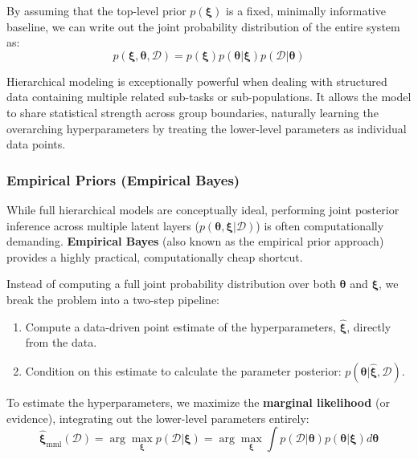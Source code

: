 \documentclass{article}
\begin{document}
By assuming that the top-level prior $p(\boldsymbol{\xi})$ is a fixed, minimally informative baseline, we can write out the joint probability distribution of the entire system as:
\begin{equation}
p(\boldsymbol{\xi}, \boldsymbol{\theta}, \mathcal{D}) = p(\boldsymbol{\xi})p(\boldsymbol{\theta}|\boldsymbol{\xi})p(\mathcal{D}|\boldsymbol{\theta})
\end{equation}

Hierarchical modeling is exceptionally powerful when dealing with structured data containing multiple related sub-tasks or sub-populations. It allows the model to share statistical strength across group boundaries, naturally learning the overarching hyperparameters by treating the lower-level parameters as individual data points.

\subsubsection{Empirical Priors (Empirical Bayes)}
While full hierarchical models are conceptually ideal, performing joint posterior inference across multiple latent layers ($p(\boldsymbol{\theta}, \boldsymbol{\xi} | \mathcal{D})$) is often computationally demanding. \textbf{Empirical Bayes} (also known as the empirical prior approach) provides a highly practical, computationally cheap shortcut. 

Instead of computing a full joint probability distribution over both $\boldsymbol{\theta}$ and $\boldsymbol{\xi}$, we break the problem into a two-step pipeline:
\begin{enumerate}
    \item Compute a data-driven point estimate of the hyperparameters, $\hat{\boldsymbol{\xi}}$, directly from the data.
    \item Condition on this estimate to calculate the parameter posterior: $p(\boldsymbol{\theta} | \hat{\boldsymbol{\xi}}, \mathcal{D})$.
\end{enumerate}

To estimate the hyperparameters, we maximize the \textbf{marginal likelihood} (or evidence), integrating out the lower-level parameters entirely:
\begin{equation}
\hat{\boldsymbol{\xi}}_{\text{mml}}(\mathcal{D}) = \arg\max_{\boldsymbol{\xi}} p(\mathcal{D}|\boldsymbol{\xi}) = \arg\max_{\boldsymbol{\xi}} \int p(\mathcal{D}|\boldsymbol{\theta})p(\boldsymbol{\theta}|\boldsymbol{\xi})d\boldsymbol{\theta}
\end{equation}
\end{document}

